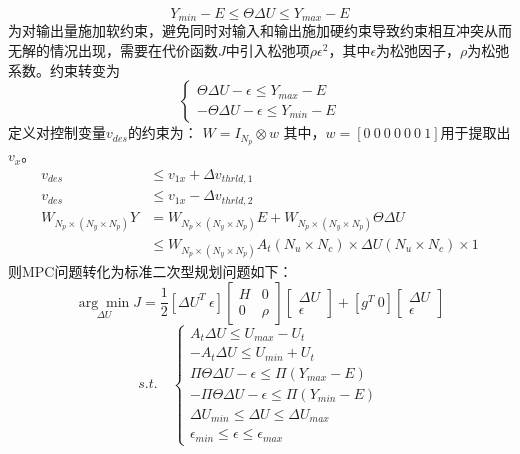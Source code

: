             \begin{equation}
            Y_{min} - E \leq \Theta \Delta U \leq Y_{max} - E
            \end{equation}
            为对输出量施加软约束，避免同时对输入和输出施加硬约束导致约束相互冲突从而无解的情况出现，需要在代价函数$J$中引入松弛项$\rho \epsilon^2$，其中$\epsilon$为松弛因子，$\rho$为松弛系数。约束转变为
            \begin{equation}
            \begin{cases}
            \Theta \Delta U - \epsilon \leq Y_{max} - E \\
            -\Theta \Delta U - \epsilon \leq Y_{min} - E
            \end{cases}
            \end{equation}
            定义对控制变量$v_{des}$的约束为：
            $W = I_{N_p} \otimes w$
            \noindent 其中，$w = [0\ 0\ 0\ 0\ 0\ 0\ 1]$用于提取出$v_x$。
            \begin{equation}
            \begin{aligned}
            v_{des} &\leq v_{1x} + \Delta v_{thrld,1} \\
            v_{des} &\leq v_{1x} - \Delta v_{thrld,2} \\
            W_{N_p \times (N_y \times N_p)} Y &= W_{N_p \times (N_y \times N_p)} E + W_{N_p \times (N_y \times N_p)} \Theta \Delta U \\
            &\leq W_{N_p \times (N_y \times N_p)} A_t (N_u \times N_c) \times \Delta U (N_u \times N_c) \times 1
            \end{aligned}
            \end{equation}
            则MPC问题转化为标准二次型规划问题如下：
            \begin{equation}
            \underset{\Delta U}{\arg\min} J = \frac{1}{2} [\Delta U^T\ \epsilon] \begin{bmatrix} H & 0 \\ 0 & \rho \end{bmatrix} \begin{bmatrix} \Delta U \\ \epsilon \end{bmatrix} + [g^T\ 0] \begin{bmatrix} \Delta U \\ \epsilon \end{bmatrix}
            \end{equation}
            \begin{equation*}
            s.t.\quad
            \begin{cases}
            A_t \Delta U \leq U_{max} - U_t \\
            -A_t \Delta U \leq U_{min} + U_t \\
            \Pi \Theta \Delta U - \epsilon \leq \Pi (Y_{max} - E) \\
            -\Pi \Theta \Delta U - \epsilon \leq \Pi (Y_{min} - E) \\
            \Delta U_{min} \leq \Delta U \leq \Delta U_{max} \\
            \epsilon_{min} \leq \epsilon \leq \epsilon_{max}
            \end{cases}
            \end{equation*}

